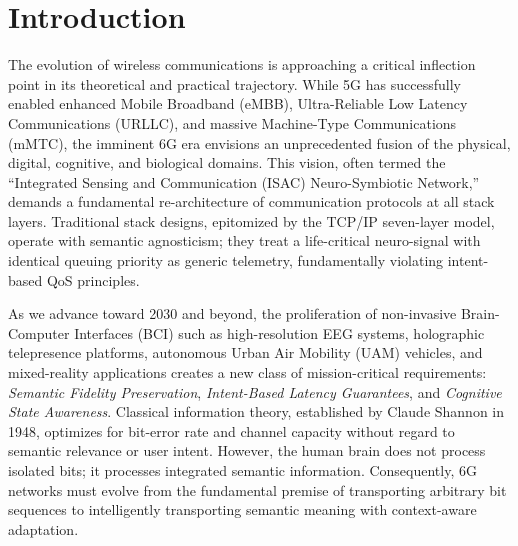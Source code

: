 \documentclass[journal]{IEEEtran}
\begin{document}
\section{Introduction}
The evolution of wireless communications is approaching a critical inflection point in its theoretical and practical trajectory. While 5G has successfully enabled enhanced Mobile Broadband (eMBB), Ultra-Reliable Low Latency Communications (URLLC), and massive Machine-Type Communications (mMTC), the imminent 6G era envisions an unprecedented fusion of the physical, digital, cognitive, and biological domains. This vision, often termed the ``Integrated Sensing and Communication (ISAC) Neuro-Symbiotic Network,'' demands a fundamental re-architecture of communication protocols at all stack layers. Traditional stack designs, epitomized by the TCP/IP seven-layer model, operate with semantic agnosticism; they treat a life-critical neuro-signal with identical queuing priority as generic telemetry, fundamentally violating intent-based QoS principles.

As we advance toward 2030 and beyond, the proliferation of non-invasive Brain-Computer Interfaces (BCI) such as high-resolution EEG systems, holographic telepresence platforms, autonomous Urban Air Mobility (UAM) vehicles, and mixed-reality applications creates a new class of mission-critical requirements: \textit{Semantic Fidelity Preservation}, \textit{Intent-Based Latency Guarantees}, and \textit{Cognitive State Awareness}. Classical information theory, established by Claude Shannon in 1948, optimizes for bit-error rate and channel capacity without regard to semantic relevance or user intent. However, the human brain does not process isolated bits; it processes integrated semantic information. Consequently, 6G networks must evolve from the fundamental premise of transporting arbitrary bit sequences to intelligently transporting semantic meaning with context-aware adaptation.
\end{document}

